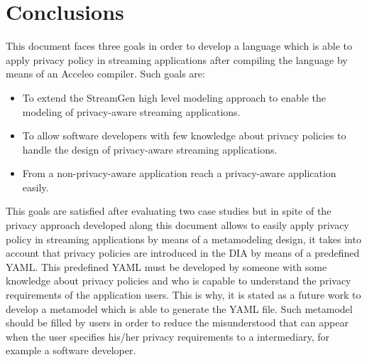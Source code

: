 \chapter[Conclusions]{Conclusions}
\label{sec:conclusions}

This document faces three goals in order to develop a language which is able to apply privacy policy in streaming applications after compiling the language by means of an Acceleo compiler. Such goals are:

\begin{itemize}
\item To extend the StreamGen high level modeling approach to enable the modeling of privacy-aware streaming applications.
\item To allow software developers with few knowledge about privacy policies to handle the design of privacy-aware streaming applications.
\item From a non-privacy-aware application reach a privacy-aware application easily.
\end{itemize}

This goals are satisfied after evaluating two case studies but in spite of the privacy approach developed along this document allows to easily apply privacy policy in streaming applications by means of a metamodeling design, it takes into account that privacy policies are introduced in the DIA by means of a predefined YAML. This predefined YAML must be developed by someone with some knowledge about privacy policies and who is capable to understand the privacy requirements of the application users. This is why, it is stated as a future work to develop a metamodel which is able to generate the YAML file. Such metamodel should be filled by users in order to reduce the misunderstood that can appear when the user specifies his/her privacy requirements to a intermediary, for example a software developer. 
